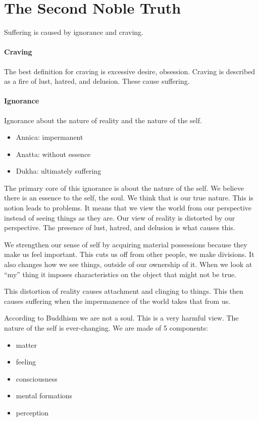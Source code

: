 \documentclass{article}
\begin{document}
\section*{The Second Noble Truth}
\label{sec:the_second_noble_truth}
Suffering is caused by ignorance and craving.

\paragraph{Craving}
\label{par:craving}
The best definition for craving is excessive desire, obsession.  Craving is described as a fire of lust, hatred, and delusion. These cause suffering.

\paragraph{Ignorance}
\label{par:ignorance}
Ignorance about the nature of reality and the nature of the self.
\begin{itemize}
	\item Annica: impermanent
	\item Anatta: without essence
	\item Dukha: ultimately suffering
\end{itemize}
The primary core of this ignorance is about the nature of the self. We believe there is an essence to the self, the soul. We think that is our true nature. This is notion leads to problems. It means that we view the world from our perspective instead of seeing things as they are. Our view of reality is distorted by our perspective. The presence of lust, hatred, and delusion is what causes this.

We strengthen our sense of self by acquiring material possessions because they make us feel important. This cuts us off from other people, we make divisions. It also changes how we see things, outside of our ownership of it. When we look at ``my'' thing it imposes characteristics on the object that might not be true.

This distortion of reality causes attachment and clinging to things. This then causes suffering when the impermanence of the world takes that from us.

According to Buddhism we are not a soul. This is a very harmful view. The nature of the self is ever-changing. We are made of 5 components:
\begin{itemize}
	\item matter
	\item feeling
	\item consciousness
	\item mental formations
	\item perception
\end{itemize}
\end{document}
